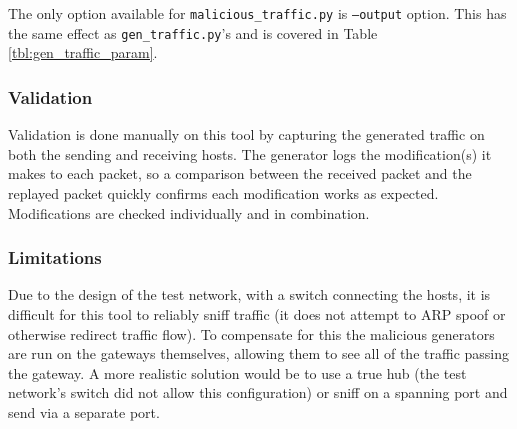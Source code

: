 \par The only option available for \texttt{malicious\_traffic.py} is \texttt{--output} option. This has the same effect as \texttt{gen\_traffic.py}'s and is covered in Table \ref{tbl:gen_traffic_param}.

\subsubsection{Validation}
\par Validation is done manually on this tool by capturing the generated traffic on both the sending and receiving hosts. The generator logs the modification(s) it makes to each packet, so a comparison between the received packet and the replayed packet quickly confirms each modification works as expected. Modifications are checked individually and in combination.

\subsubsection{Limitations}
\par Due to the design of the test network, with a switch connecting the hosts, it is difficult for this tool to reliably sniff traffic (it does not attempt to \ac{ARP} spoof or otherwise redirect traffic flow). To compensate for this the malicious generators are run on the gateways themselves, allowing them to see all of the traffic passing the gateway. A more realistic solution would be to use a true hub (the test network's switch did not allow this configuration) or sniff on a spanning port and send via a separate port.

